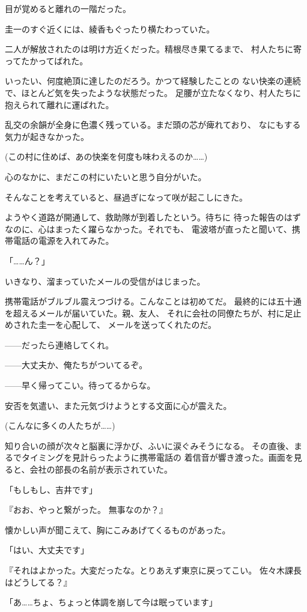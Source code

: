 ﻿\documentclass[
    book,tate,
    line_length=30zw,
    jafontsize=12pt,
    paper=b5j,
    landscape,
    ]{jlreq}
\begin{document}
目が覚めると離れの一階だった。

圭一のすぐ近くには、綾香もぐったり横たわっていた。

二人が解放されたのは明け方近くだった。精根尽き果てるまで、
村人たちに寄ってたかってばれた。

いったい、何度絶頂に達したのだろう。かつて経験したことの
ない快楽の連続で、ほとんど気を失ったような状態だった。
足腰が立たなくなり、村人たちに抱えられて離れに運ばれた。

乱交の余韻が全身に色濃く残っている。まだ頭の芯が痺れており、
なにもする気力が起きなかった。

(この村に住めば、あの快楽を何度も味わえるのか……)

心のなかに、まだこの村にいたいと思う自分がいた。

そんなことを考えていると、昼過ぎになって咲が起こしにきた。

ようやく道路が開通して、救助隊が到着したという。待ちに
待った報告のはずなのに、心はまったく躍らなかった。それでも、
電波塔が直ったと聞いて、携帯電話の電源を入れてみた。

「……ん？」

いきなり、溜まっていたメールの受信がはじまった。

携帯電話がブルブル震えつづける。こんなことは初めてだ。
最終的には五十通を超えるメールが届いていた。親、友人、
それに会社の同僚たちが、村に足止めされた圭一を心配して、
メールを送ってくれたのだ。

------だったら連絡してくれ。

------大丈夫か、俺たちがついてるぞ。

------早く帰ってこい。待ってるからな。

安否を気遣い、また元気づけようとする文面に心が震えた。

(こんなに多くの人たちが……)

知り合いの顔が次々と脳裏に浮かび、ふいに涙ぐみそうになる。
その直後、まるでタイミングを見計らったように携帯電話の
着信音が響き渡った。画面を見ると、会社の部長の名前が表示されていた。

「もしもし、吉井です」

『おお、やっと繋がった。 無事なのか？』

懐かしい声が聞こえて、胸にこみあげてくるものがあった。

「はい、大丈夫です」

『それはよかった。大変だったな。とりあえず東京に戻ってこい。
佐々木課長はどうしてる？』

「あ……ちょ、ちょっと体調を崩して今は眠っています」
\end{document}
